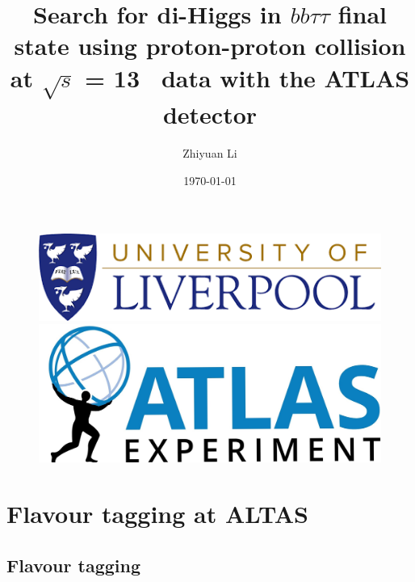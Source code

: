 \documentclass[letterpaper,12pt]{article}
\begin{document}
\title{Search for di-Higgs in $bb\tau\tau$ final state using proton-proton collision at $\sqrt{s}$ = 13 \TeV\ data with the ATLAS detector}%
\author{ Zhiyuan Li}
\date{\today}
\maketitle
\begin{figure}[htp]
\begin{minipage}[b]{.5\textwidth}
\centering
\includegraphics[width=1\textwidth]{logo.png}
\end{minipage}\hfill
\begin{minipage}[b]{.45\textwidth}
\vspace{3em}
\centering
\includegraphics[width=1\textwidth]{ATLAS-Logo-Ref-RGB-H_1.jpg}
\end{minipage}
\end{figure}
\newpage


\tableofcontents{}
\printindex{}


\newpage
\section{Flavour tagging at ALTAS}


\subsection{Flavour tagging}
\end{document}
